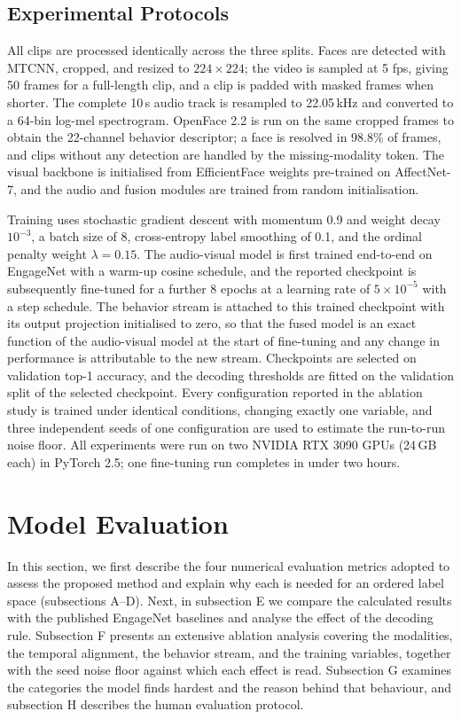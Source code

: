 \documentclass[journal]{IEEEtran}
\begin{document}
\subsection{Experimental Protocols}

All clips are processed identically across the three splits. Faces are detected with MTCNN, cropped, and resized to $224 \times 224$; the video is sampled at 5 fps, giving 50 frames for a full-length clip, and a clip is padded with masked frames when shorter. The complete 10\,s audio track is resampled to 22.05\,kHz and converted to a 64-bin log-mel spectrogram. OpenFace 2.2 is run on the same cropped frames to obtain the 22-channel behavior descriptor; a face is resolved in 98.8\% of frames, and clips without any detection are handled by the missing-modality token. The visual backbone is initialised from EfficientFace weights pre-trained on AffectNet-7, and the audio and fusion modules are trained from random initialisation.

Training uses stochastic gradient descent with momentum 0.9 and weight decay $10^{-3}$, a batch size of 8, cross-entropy label smoothing of 0.1, and the ordinal penalty weight $\lambda = 0.15$. The audio-visual model is first trained end-to-end on EngageNet with a warm-up cosine schedule, and the reported checkpoint is subsequently fine-tuned for a further 8 epochs at a learning rate of $5 \times 10^{-5}$ with a step schedule. The behavior stream is attached to this trained checkpoint with its output projection initialised to zero, so that the fused model is an exact function of the audio-visual model at the start of fine-tuning and any change in performance is attributable to the new stream. Checkpoints are selected on validation top-1 accuracy, and the decoding thresholds are fitted on the validation split of the selected checkpoint. Every configuration reported in the ablation study is trained under identical conditions, changing exactly one variable, and three independent seeds of one configuration are used to estimate the run-to-run noise floor. All experiments were run on two NVIDIA RTX 3090 GPUs (24\,GB each) in PyTorch 2.5; one fine-tuning run completes in under two hours.

\section{Model Evaluation}
\label{sec:eval}

In this section, we first describe the four numerical evaluation metrics adopted to assess the proposed method and explain why each is needed for an ordered label space (subsections A--D). Next, in subsection E we compare the calculated results with the published EngageNet baselines and analyse the effect of the decoding rule. Subsection F presents an extensive ablation analysis covering the modalities, the temporal alignment, the behavior stream, and the training variables, together with the seed noise floor against which each effect is read. Subsection G examines the categories the model finds hardest and the reason behind that behaviour, and subsection H describes the human evaluation protocol.
\end{document}
